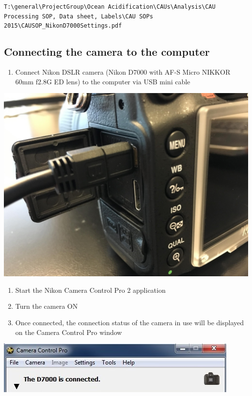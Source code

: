\documentclass[]{book}
\providecommand{\tightlist}{%
  \setlength{\itemsep}{0pt}\setlength{\parskip}{0pt}}
\begin{document}
\begin{verbatim}
T:\general\ProjectGroup\Ocean Acidification\CAUs\Analysis\CAU Processing SOP, Data sheet, Labels\CAU SOPs 2015\CAUSOP_NikonD7000Settings.pdf
\end{verbatim}

\hypertarget{connecting-the-camera-to-the-computer}{%
\subsection{Connecting the camera to the computer}\label{connecting-the-camera-to-the-computer}}

\begin{enumerate}
\def\labelenumi{\arabic{enumi}.}
\tightlist
\item
  Connect Nikon DSLR camera (Nikon D7000 with AF-S Micro NIKKOR 60mm f2.8G ED lens) to the computer via USB mini cable
\end{enumerate}

\includegraphics{images/Camera.jpg}

\begin{enumerate}
\def\labelenumi{\arabic{enumi}.}
\setcounter{enumi}{1}
\item
  Start the Nikon Camera Control Pro 2 application
\item
  Turn the camera ON
\item
  Once connected, the connection status of the camera in use will be displayed on the Camera Control Pro window
\end{enumerate}

\includegraphics{images/Camera2.jpg}
\end{document}
